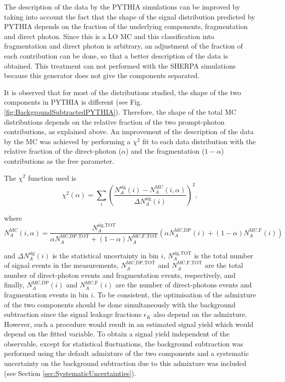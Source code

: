 \documentclass[12pt, twoside]{article}
\numberwithin{equation}{section}
\numberwithin{figure}{section}
\begin{document}
The description of the data by the PYTHIA simulations can be improved by taking into account the fact that the shape of the signal distribution predicted by PYTHIA depends on the fraction of the underlying components, fragmentation and direct photon. Since this is a LO MC and this classification into fragmentation and direct photon is arbitrary, an adjustment of the fraction of each contribution can be done, so that a better description of the data is obtained. This treatment can not performed with the SHERPA simulations because this generator does not give the components separated.

It is observed that for most of the distributions studied, the shape of the two components in PYTHIA is different (see Fig.\,\ref{fig:BackgroundSubtractedPYTHIA}). Therefore, the shape of the total MC distributions depends on the relative fraction of the two prompt-photon contributions, as explained above. An improvement of the description of the data by the MC was achieved by performing a $\chi^{2}$ fit to each data distribution with the relative fraction of the direct-photon ($\alpha$) and the fragmentation ($1 - \alpha$) contributions as the free parameter.

The $\chi^{2}$ function used is
\begin{equation}    \label{eq:ChiSquareFunction}
    \chi^{2}(\alpha) = \sum_{i} \left( \frac{N^{\text{sig}}_{A}(i) - N^{\text{MC}}_{A}(i, \alpha)}{\Delta N^{\text{sig}}_{A}(i)} \right)^{2} ,
\end{equation}

where
\begin{equation}    \label{eq:MCEventsChiSquare}
    N^{\text{MC}}_{A}(i,\alpha) = \frac{N^{\text{sig,TOT}}_{A}}{\alpha N^{\text{MC,DP,TOT}}_{A} + (1-\alpha)N^{\text{MC,F,TOT}}_{A}} \left( \alpha N^{\text{MC,DP}}_{A}(i) + (1-\alpha)N^{\text{MC,F}}_{A}(i) \right)
\end{equation}

and $\Delta N^{\text{sig}}_{A}(i)$ is the statistical uncertainty in bin $i$, $N^{\text{sig,TOT}}_{A}$ is the total number of signal events in the measurements, $N^{\text{MC,DP,TOT}}_{A}$ and $N^{\text{MC,F,TOT}}_{A}$ are the total number of direct-photon events and fragmentation events, respectively, and finally, $N^{\text{MC,DP}}_{A}(i)$ and $N^{\text{MC,F}}_{A}(i)$ are the number of direct-photons events and fragmentation events in bin $i$. To be consistent, the optimisation of the admixture of the two components should be done simultaneously with the background subtraction since the signal leakage fractions $\epsilon_{K}$ also depend on the admixture. However, such a procedure would result in an estimated signal yield which would depend on the fitted variable. To obtain a signal yield independent of the observable, except for statistical fluctuations, the background subtraction was performed using the default admixture of the two components and a systematic uncertainty on the background subtraction due to this admixture was included (see Section \ref{sec:SystematicUncertainties}).
\end{document}
